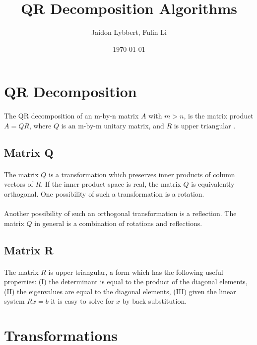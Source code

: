\documentclass{article}
\title{QR Decomposition Algorithms}
\author{Jaidon Lybbert, Fulin Li}
\date{\today{}}
\begin{document}
\maketitle{}
\tableofcontents{}
\listofalgorithms{}

\section{QR Decomposition}
\paragraph{}
The QR decomposition of an m-by-n matrix $A$ with $m>n$, is the matrix product $A = QR$, where $Q$ is an 
m-by-m unitary matrix, and $R$ is upper triangular \cite{bhaskar86qr}.

\subsection{Matrix Q}
\paragraph{}
The matrix $Q$ is a transformation which preserves inner products of column vectors of $R$. If the 
inner product space is real, the matrix $Q$ is equivalently orthogonal. One possibility of such a 
transformation is a rotation.
\paragraph{}
Another possibility of such an orthogonal transformation is a reflection. The matrix $Q$ in general 
is a combination of rotations and reflections.

\subsection{Matrix R}
\paragraph{}
The matrix $R$ is upper triangular, a form which has the following useful properties: (I) the determinant is equal to the product of the diagonal elements, (II) the eigenvalues are equal to the diagonal elements, (III) given the linear system $Rx = b$ it is easy to solve for $x$ by back substitution.

\section{Transformations}
\end{document}
